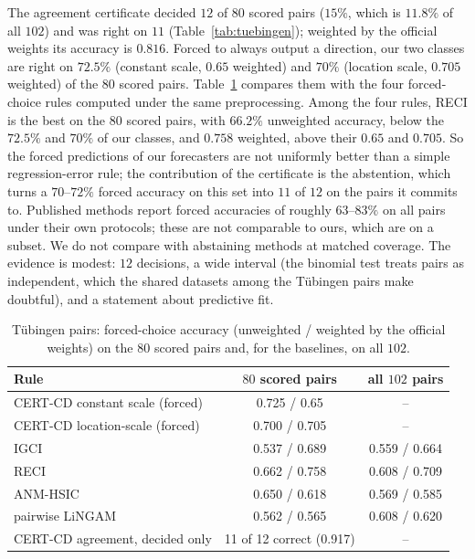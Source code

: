 The agreement certificate decided $12$ of $80$ scored pairs ($15\%$, which is
$11.8\%$ of all $102$) and was right on $11$
(Table~\ref{tab:tuebingen}); weighted by the official weights its accuracy is
$0.816$. Forced to always output a direction, our two classes are right on $72.5\%$
(constant scale, $0.65$ weighted) and $70\%$ (location scale, $0.705$ weighted)
of the $80$ scored pairs. Table~\ref{tab:tueb-base} compares them with the four
forced-choice rules computed under the same preprocessing. Among the four rules, RECI is the best on the $80$ scored pairs, with $66.2\%$
unweighted accuracy, below the $72.5\%$ and $70\%$ of our classes, and $0.758$
weighted, above their $0.65$ and $0.705$. So the forced predictions of our forecasters are not uniformly better
than a simple regression-error rule; the contribution of the certificate is the
abstention, which turns a $70$--$72\%$ forced accuracy on this set into $11$ of $12$
on the pairs it commits to. Published methods report forced accuracies of
roughly $63$--$83\%$ on all pairs
\citep{mooij2016distinguishing,tagasovska2020bqcd,immer2023loci} under their own
protocols; these are not comparable to ours, which are on a subset. We do not
compare with abstaining methods at matched coverage. The evidence is modest: $12$
decisions, a wide interval (the binomial test treats pairs as independent, which
the shared datasets among the Tübingen pairs make doubtful), and a statement about
predictive fit.

\begin{table}[t]
\caption{Tübingen pairs: forced-choice accuracy (unweighted / weighted by the
official weights) on the $80$ scored pairs and, for the baselines, on all $102$.}
\label{tab:tueb-base}
\small
\begin{tabular}{@{}lcc@{}}
\toprule
Rule & $80$ scored pairs & all $102$ pairs\\
\midrule
CERT-CD constant scale (forced) & 0.725 / 0.65 & --\\
CERT-CD location-scale (forced) & 0.700 / 0.705 & --\\
IGCI & 0.537 / 0.689 & 0.559 / 0.664\\
RECI & 0.662 / 0.758 & 0.608 / 0.709\\
ANM-HSIC & 0.650 / 0.618 & 0.569 / 0.585\\
pairwise LiNGAM & 0.562 / 0.565 & 0.608 / 0.620\\
\midrule
CERT-CD agreement, decided only & 11 of 12 correct (0.917) & --\\
\bottomrule
\end{tabular}
\end{table}

